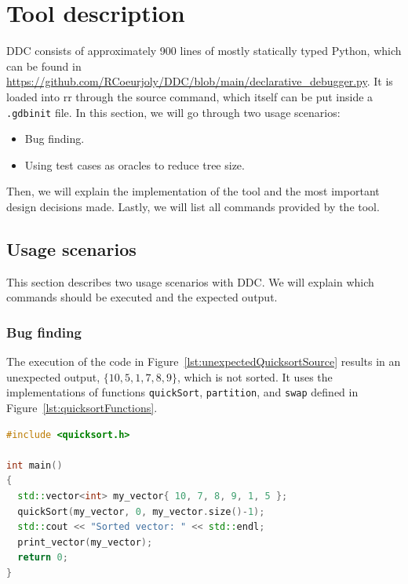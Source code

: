 \chapter{Tool description}
\label{cap:toolDescription}
DDC consists of approximately 900 lines of mostly statically typed Python, which can be found in \url{https://github.com/RCoeurjoly/DDC/blob/main/declarative_debugger.py}.
%
It is loaded into rr through the source command, which itself can be put inside a \verb|.gdbinit| file.
%
In this section, we will go through two usage scenarios:
\begin{itemize}
    \item Bug finding.
    \item Using test cases as oracles to reduce tree size.
\end{itemize}

Then, we will explain the implementation of the tool and the most important design decisions made.
%
Lastly, we will list all commands provided by the tool.

\section{Usage scenarios}
This section describes two usage scenarios with DDC.
We will explain which commands should be executed and the expected output.

\subsection{Bug finding}
The execution of the code in Figure~\ref{lst:unexpectedQuicksortSource} results in an unexpected output, \(\{10, 5, 1, 7, 8, 9\}\), which is not sorted.
It uses the implementations of functions \verb|quickSort|, \verb|partition|, and \verb|swap| defined in Figure~\ref{lst:quicksortFunctions}.
\begin{lstlisting}[language=C++, caption={Code that results in unexpected output}, frame=tb, label={lst:unexpectedQuicksortSource}]
#include <quicksort.h>

int main()
{
  std::vector<int> my_vector{ 10, 7, 8, 9, 1, 5 };
  quickSort(my_vector, 0, my_vector.size()-1);
  std::cout << "Sorted vector: " << std::endl;
  print_vector(my_vector);
  return 0;
}
\end{lstlisting}

